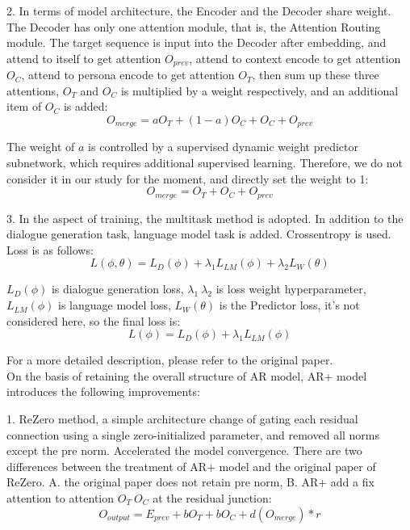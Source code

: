 \documentclass[letterpaper]{article} %
\DeclareRobustCommand{\citeext}[1]{\cite[#1]{#1}}
\begin{document}
2. In terms of model architecture, the Encoder and the Decoder share weight. The Decoder has only one attention module, that is, the Attention Routing module. The target sequence is input into the Decoder after embedding, and attend to itself to get attention $O_{prev}$, attend to context encode to get attention $O_C$, attend to persona encode to get attention $O_T$, then sum up these three attentions, $O_T$ and $O_C$ is multiplied by a weight respectively, and an additional item of $O_C$ is added: 
\begin{equation}
O_{merge} = aO_T + (1 - a)O_C + O_C + O_{prev}    
\end{equation}

The weight of $a$ is controlled by a supervised dynamic weight predictor subnetwork, which requires additional supervised learning. Therefore, we do not consider it in our study for the moment, and directly set the weight to 1: 
\begin{equation}
O_{merge} = O_T + O_C + O_{prev}    
\end{equation}

3. In the aspect of training, the multitask method is adopted. In addition to the dialogue generation task, language model task is added. Crossentropy is used. Loss is as follows: 
\begin{equation}
L(\phi, \theta) = L_D(\phi) + \lambda_1L_{LM}(\phi) + \lambda_2L_W(\theta)
\end{equation}

$L_D(\phi)$ is dialogue generation loss, $\lambda_1~\lambda_2$ is loss weight hyperparameter, $L_{LM}(\phi)$ is language model loss, $L_W(\theta)$ is the Predictor loss, it's not considered here, so the final loss is:
\begin{equation}
L(\phi) = L_D(\phi) + \lambda_1L_{LM}(\phi)
\end{equation}

For a more detailed description, please refer to the original paper\citeext{Zheng2019}. \\

On the basis of retaining the overall structure of AR model, AR+ model introduces the following improvements: 

1. ReZero\citeext{Bachlechner2020} method, a simple architecture change of gating each residual connection using a single zero-initialized parameter, and removed all norms except the pre norm. Accelerated the model convergence. There are two differences between the treatment of AR+ model and the original paper of ReZero. A. the original paper does not retain pre norm, B. AR+ add a fix attention to attention $O_T~O_C$ at the residual junction: 
\begin{equation}
O_{output} = E_{prev} + bO_T + bO_C + d(O_{merge}) * r
\end{equation}
\end{document}
